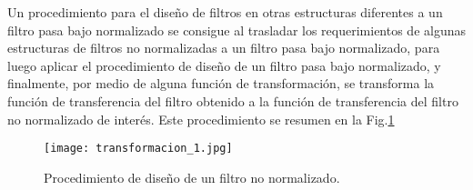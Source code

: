 \documentclass[informe.tex]{subfiles}
\begin{document}
Un procedimiento para el diseño de filtros en otras estructuras diferentes a un filtro pasa bajo normalizado se consigue al trasladar los requerimientos de algunas estructuras de filtros no normalizadas a un filtro pasa bajo normalizado, para luego aplicar el procedimiento de diseño de un filtro pasa bajo normalizado, y finalmente, por medio de alguna función de transformación, se transforma la función de transferencia del filtro obtenido a la función de transferencia del filtro no normalizado de interés. Este procedimiento se resumen en la Fig.\ref{fig:transformacion:frecuencia:proceso}
				
		\begin{figure}[h]
		\centering
		\texttt{[image: transformacion\_1.jpg]}
		\caption{Procedimiento de diseño de un filtro no normalizado.}
		\label{fig:transformacion:frecuencia:proceso}
		\end{figure}
\end{document}
